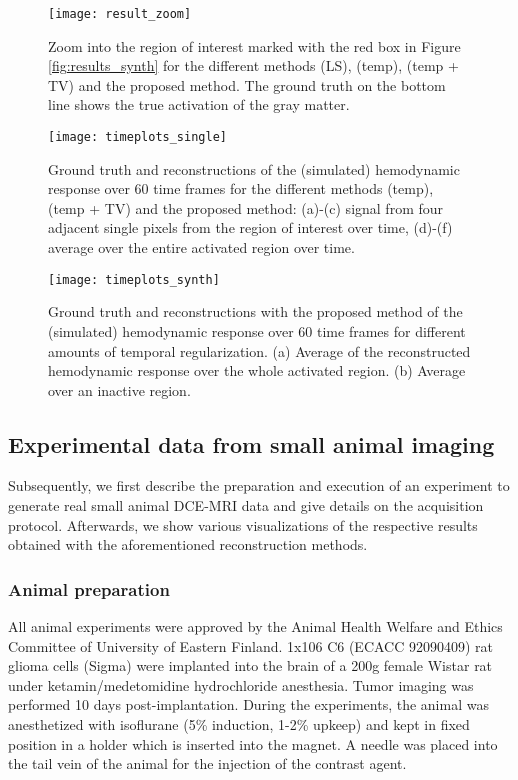 \begin{figure}[ht!]
	\texttt{[image: result\_zoom]}
    \caption{Zoom into the region of interest marked with the red box in Figure \ref{fig:results_synth} for the different methods (LS), (temp), (temp + TV) and the proposed method.
    The ground truth on the bottom line shows the true activation of the gray matter.}
    \label{fig:results_zoom}
\end{figure}

\begin{figure}[ht!]
	\texttt{[image: timeplots\_single]}
    \caption{Ground truth and reconstructions of the (simulated) hemodynamic response over 60 time frames for the different methods (temp), (temp + TV) and the proposed method: (a)-(c) signal from four adjacent single pixels from the region of interest over time, (d)-(f) average over the entire activated region over time. 
    }
    \label{fig:timeplots_single}
\end{figure}

\begin{figure}[t]
	\texttt{[image: timeplots\_synth]}
    \caption{Ground truth and reconstructions with the proposed method of the (simulated) hemodynamic response over 60 time frames for different amounts of temporal regularization.
    (a) Average of the reconstructed hemodynamic response over the whole activated region.
    (b) Average over an inactive region.}
    \label{fig:timeplots_synth}
\end{figure}



\subsection{Experimental data from small animal imaging}
\label{experes}
Subsequently, we first describe the preparation and execution of an experiment to generate real small animal DCE-MRI data and give details on the acquisition protocol.
Afterwards, we show various visualizations of the respective results obtained with the aforementioned reconstruction methods.

\subsubsection{Animal preparation}
All animal experiments were approved by the Animal Health Welfare and Ethics Committee of University of Eastern Finland. 
1x106 C6 (ECACC 92090409) rat glioma cells (Sigma) were implanted into the brain of a 200g female Wistar rat under ketamin/medetomidine hydrochloride anesthesia. 
Tumor imaging was performed 10 days post-implantation. 
During the experiments, the animal was anesthetized with isoflurane (5\% induction, 1-2\% upkeep) and kept in fixed position in a holder which is inserted into the magnet. 
A needle was placed into the tail vein of the animal for the injection of the contrast agent.

